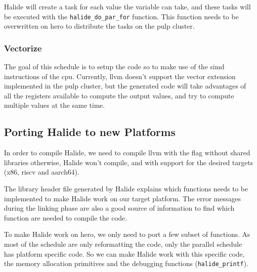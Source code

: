 Halide will create a task for each value the variable can take, and these tasks will be executed with the \texttt{halide\_do\_par\_for} function. This function needs to be overwritten on \gls{hero} to distribute the tasks on the \gls{pulp} cluster. 


	\subsubsection{Vectorize}
	The goal of this schedule is to setup the code so to make use of the \gls{simd} instructions of the \gls{cpu}. Currently, \gls{llvm} doesn't support the vector extension  implemented in the \gls{pulp} cluster, but the generated code will take advantages of all the registers available to compute the output values, and try to compute multiple values at the same time.


	\subsection { Porting Halide to new Platforms}

	In order to compile Halide, we need to compile \gls{llvm} with the flag without shared libraries otherwise, Halide won't compile, and  with support for the desired targets (x86, \gls{riscv} and \gls{aarch64}).

	The library header file generated by Halide explains which functions needs to be implemented to make Halide work on our target platform.
	The error messages during the linking phase are also a good source of information to find which function are needed to compile the code. 

	To make Halide work on \gls{hero}, we only need to port a few subset of functions. As most of the schedule are only reformatting the code, only the parallel schedule has platform specific code. So we can make Halide work with this specific code, the memory allocation primitives and the debugging functions (\texttt{halide\_printf}).



		

